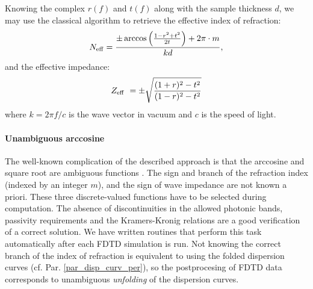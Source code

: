 Knowing the complex $r(f)$ and $t(f)$ along with the sample thickness $d$, we may use the
classical algorithm \cite{smith2002determination}\cite[pp. 51-55]{shalaev2010book} to retrieve the effective index of refraction:
\begin{equation}
	N_{\rm eff} = \frac{\pm \arccos\left(\frac{1 - r^2+t^2}{2 t}\right) + 2\pi \cdot m}{k d},
\end{equation}
and the effective impedance:
\begin{equation}
	Z_{\rm eff}~= \pm \sqrt{\frac{(1+r)^2 - t^2}{(1-r)^2 - t^2}} \label{eq_Z}
\end{equation}
where $k = 2\pi f/c$ is the wave vector in vacuum and $c$ is the speed of light.

\paragraph{Unambiguous arccosine} %
The well-known complication of the described approach is that the arccosine and square root are ambiguous functions \cite{simovski2009material}. %
The sign and branch of the refraction index (indexed by an integer $m$), and the sign of wave impedance are not known a priori.  These three discrete-valued functions have to be selected during computation. The absence of discontinuities %
in the allowed photonic bands, passivity requirements %
and the Kramers-Kronig relations are a good verification of a correct solution. We have written routines that perform this task automatically after each FDTD simulation is run. Not knowing the correct branch of the index of refraction is equivalent to using the folded dispersion curves (cf. Par. \ref{par_disp_curv_per}), %
so the postprocesing of FDTD data corresponds to unambiguous \textit{unfolding} of the dispersion curves.

